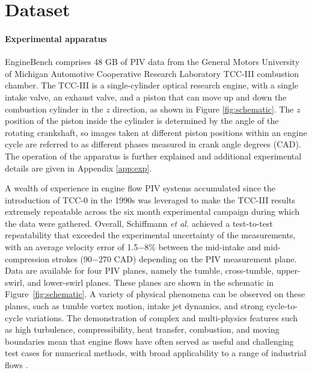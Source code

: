 \documentclass{article}
\begin{document}
\section{Dataset}
\label{sec:data}
\paragraph{Experimental apparatus}
EngineBench comprises 48 GB of PIV data from the General Motors University of Michigan Automotive Cooperative Research Laboratory TCC-III combustion chamber. The TCC-III is a single-cylinder optical research engine, with a single intake valve, an exhaust valve, and a piston that can move up and down the combustion cylinder in the $z$ direction, as shown in Figure \ref{fig:schematic}. The $z$ position of the piston inside the cylinder is determined by the angle of the rotating crankshaft, so images taken at different piston positions within an engine cycle are referred to as different phases measured in crank angle degrees (CAD). The operation of the apparatus is further explained and additional experimental details are given in Appendix \ref{app:exp}.

A wealth of experience in engine flow PIV systems accumulated since the introduction of TCC-0 in the 1990s \cite{reuss1995particle,reuss2002particle,abraham2013high} was leveraged to make the TCC-III results extremely repeatable across the six month experimental campaign during which the data were gathered. Overall, Schiffmann \textit{et al.} \cite{schiffmann2016tcc} achieved a test-to-test repeatability that exceeded the experimental uncertainty of the measurements, with an average velocity error of 1.5$-$8\% between the mid-intake and mid-compression strokes (90$-$270 CAD) depending on the PIV measurement plane. Data are available for four PIV planes, namely the tumble, cross-tumble, upper-swirl, and lower-swirl planes. These planes are shown in the schematic in Figure~\ref{fig:schematic}. A variety of physical phenomena can be observed on these planes, such as tumble vortex motion, intake jet dynamics, and strong cycle-to-cycle variations. 
The demonstration of complex and multi-physics features such as high turbulence, compressibility, heat transfer, combustion, and moving boundaries
mean that engine flows have often served as useful and challenging test cases for numerical methods, with broad applicability to a range of industrial flows \cite{fogleman2004application,yang2019applicability,zhao2023applications,reitz1995development}.
\end{document}
